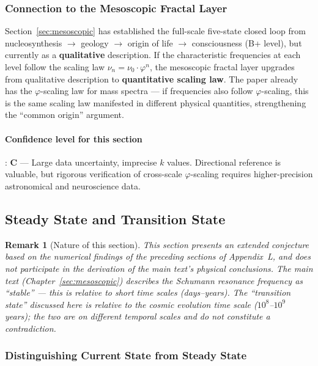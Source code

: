\documentclass[12pt,a4paper,twocolumn]{article}
\renewcommand{\phi}{\varphi}
\newtheorem{remark}[theorem]{Remark}
\begin{document}
\subsubsection{Connection to the Mesoscopic Fractal Layer}

Section~\ref{sec:mesoscopic} has established the full-scale five-state closed loop from nucleosynthesis $\to$ geology $\to$ origin of life $\to$ consciousness (B+ level), but currently as a \textbf{qualitative} description. If the characteristic frequencies at each level follow the scaling law $\nu_n = \nu_0 \cdot \phi^n$, the mesoscopic fractal layer upgrades from qualitative description to \textbf{quantitative scaling law}. The paper already has the $\phi$-scaling law for mass spectra --- if frequencies also follow $\phi$-scaling, this is the same scaling law manifested in different physical quantities, strengthening the ``common origin'' argument.

\paragraph{Confidence level for this section}: \textbf{C} --- Large data uncertainty, imprecise $k$ values. Directional reference is valuable, but rigorous verification of cross-scale $\phi$-scaling requires higher-precision astronomical and neuroscience data.

\subsection{Steady State and Transition State}
\label{subsec:steady_transition}

\begin{remark}[Nature of this section]
This section presents an extended conjecture based on the numerical findings of the preceding sections of Appendix~L, and does not participate in the derivation of the main text's physical conclusions. The main text (Chapter~\ref{sec:mesoscopic}) describes the Schumann resonance frequency as ``stable'' --- this is relative to short time scales (days--years). The ``transition state'' discussed here is relative to the cosmic evolution time scale ($10^8$--$10^9$ years); the two are on different temporal scales and do not constitute a contradiction.
\end{remark}

\subsubsection{Distinguishing Current State from Steady State}
\end{document}

